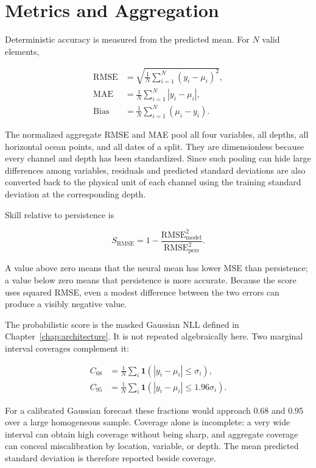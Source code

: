 \section{Metrics and Aggregation}

Deterministic accuracy is measured from the predicted mean. For $N$ valid elements,

\begin{align}
\mathrm{RMSE} &= \sqrt{\frac{1}{N}\sum_{i=1}^{N}(y_i-\mu_i)^2},\\
\mathrm{MAE} &= \frac{1}{N}\sum_{i=1}^{N}|y_i-\mu_i|,\\
\mathrm{Bias} &= \frac{1}{N}\sum_{i=1}^{N}(\mu_i-y_i).
\end{align}

The normalized aggregate RMSE and MAE pool all four variables, all depths, all horizontal ocean points, and all dates of a split. They are dimensionless because every channel and depth has been standardized. Since such pooling can hide large differences among variables, residuals and predicted standard deviations are also converted back to the physical unit of each channel using the training standard deviation at the corresponding depth.

Skill relative to persistence is

\[
S_{\mathrm{RMSE}}=1-
\frac{\mathrm{RMSE}_{\mathrm{model}}^2}
{\mathrm{RMSE}_{\mathrm{pers}}^2}.
\]

A value above zero means that the neural mean has lower MSE than persistence; a value below zero means that persistence is more accurate. Because the score uses squared RMSE, even a modest difference between the two errors can produce a visibly negative value.

The probabilistic score is the masked Gaussian NLL defined in Chapter~\ref{chap:architecture}. It is not repeated algebraically here. Two marginal interval coverages complement it:

\begin{align}
C_{68} &= \frac{1}{N}\sum_i
\mathbf{1}(|y_i-\mu_i|\leq\sigma_i),\\
C_{95} &= \frac{1}{N}\sum_i
\mathbf{1}(|y_i-\mu_i|\leq1.96\sigma_i).
\end{align}

For a calibrated Gaussian forecast these fractions would approach 0.68 and 0.95 over a large homogeneous sample. Coverage alone is incomplete: a very wide interval can obtain high coverage without being sharp, and aggregate coverage can conceal miscalibration by location, variable, or depth. The mean predicted standard deviation is therefore reported beside coverage.

